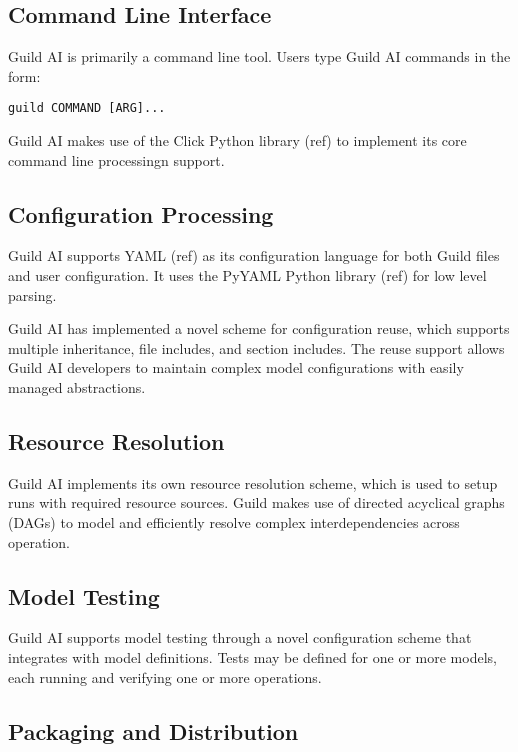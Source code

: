 \documentclass{article}
\begin{document}
\subsection{Command Line Interface}

Guild AI is primarily a command line tool. Users type Guild AI
commands in the form:

{\footnotesize
\begin{verbatim}
guild COMMAND [ARG]...
\end{verbatim}}

Guild AI makes use of the Click Python library (ref) to implement its
core command line processingn support.

\subsection{Configuration Processing}

Guild AI supports YAML (ref) as its configuration language for both
Guild files and user configuration. It uses the PyYAML Python library
(ref) for low level parsing.

Guild AI has implemented a novel scheme for configuration reuse, which
supports multiple inheritance, file includes, and section
includes. The reuse support allows Guild AI developers to maintain
complex model configurations with easily managed abstractions.

\subsection{Resource Resolution}

Guild AI implements its own resource resolution scheme, which is used
to setup runs with required resource sources. Guild makes use of
directed acyclical graphs (DAGs) to model and efficiently resolve
complex interdependencies across operation.

\subsection{Model Testing}

Guild AI supports model testing through a novel configuration scheme
that integrates with model definitions. Tests may be defined for one
or more models, each running and verifying one or more operations.

\subsection{Packaging and Distribution}
\end{document}
